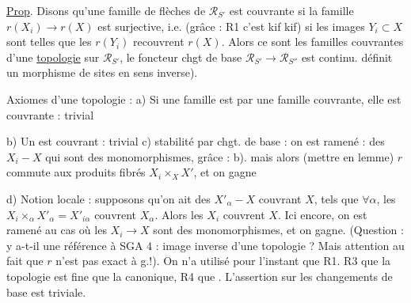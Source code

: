 \uline{Prop}.  Disons qu'une famille de flèches  de $\mathscr R_{S'}$ est couvrante si la famille $r(X_i)\longrightarrow r(X)$ est surjective, i.e. (grâce : R1 c'est kif kif) si les images $Y_i\subset X$ sont telles que les $r(Y_i)$ recouvrent $r(X)$. Alors ce sont les familles couvrantes d'une \uline{topologie} sur $\mathscr R_{S'}$,   le foncteur chgt de base $\mathscr R_{S'}\longrightarrow\mathscr R_{S''}$ est continu. \unsure{(donc|Comme|[donc}
définit un morphisme de sites en sens inverse).

Axiomes d'une topologie : a) Si une famille est  par une famille couvrante, elle est couvrante : trivial

b) Un  est couvrant : trivial \quad c) stabilité par chgt. de base : on est ramené : des $X_i-X$ qui sont des monomorphismes, grâce : b).
mais alors (mettre en lemme) $r$ commute aux produits fibrés $X_i\times_X X'$, et on gagne

d) Notion locale : supposons qu'on ait des $X'_\alpha-X$ couvrant $X$, tels que $\forall\alpha$, les $X_i\times_\alpha X'_\alpha=X'_{i\alpha}$ couvrent $X_\alpha$. Alors les $X_i$ couvrent $X$. Ici encore, on est ramené au cas où les $X_i\to X$ sont des monomorphismes, et on gagne.
(Question : y a-t-il une référence à SGA 4 : image inverse d'une topologie ? Mais attention au fait que $r$ n'est pas exact à g.!). On n'a utilisé pour l'instant que R1. R3  que la topologie est  fine que la canonique, R4 que . L'assertion sur les changements de base est triviale.


